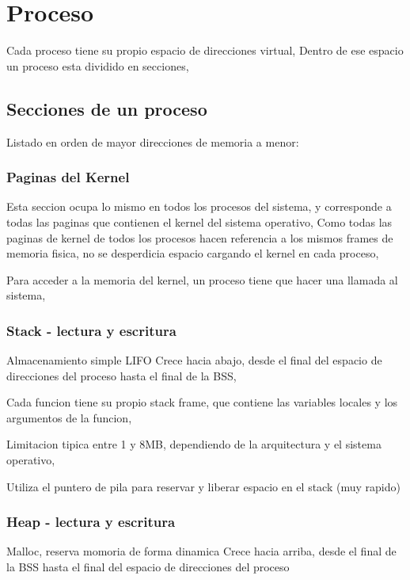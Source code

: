 \section{Proceso}

Cada proceso tiene su propio espacio de direcciones virtual,
Dentro de ese espacio un proceso esta dividido en secciones,

\subsection{Secciones de un proceso}

Listado en orden de mayor direcciones de memoria a menor:

\subsubsection{Paginas del Kernel}

Esta seccion ocupa lo mismo en todos los procesos del sistema,
y corresponde a todas las paginas que contienen el kernel del sistema operativo,
Como todas las paginas de kernel de todos los procesos hacen referencia a los mismos frames de memoria fisica,
no se desperdicia espacio cargando el kernel en cada proceso,

Para acceder a la memoria del kernel, un proceso tiene que hacer una llamada al sistema,

\subsubsection{Stack - lectura y escritura}

Almacenamiento simple LIFO
Crece hacia abajo, desde el final del espacio de direcciones del proceso hasta el final de la BSS,

Cada funcion tiene su propio stack frame, que contiene las variables locales y los argumentos de la funcion,

Limitacion tipica entre 1 y 8MB, dependiendo de la arquitectura y el sistema operativo,

Utiliza el puntero de pila para reservar y liberar espacio en el stack (muy rapido)

\subsubsection{Heap - lectura y escritura}

Malloc, reserva momoria de forma dinamica
Crece hacia arriba, desde el final de la BSS hasta el final del espacio de direcciones del proceso

